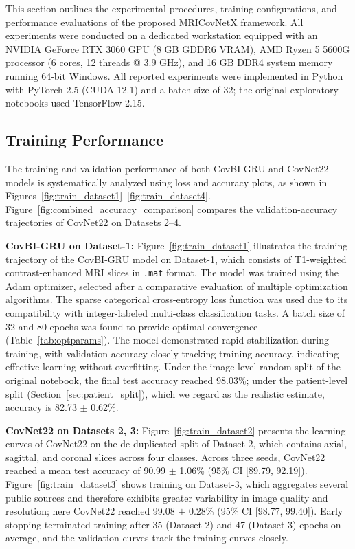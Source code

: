 \documentclass[a4paper,fleqn]{cas-sc}
\begin{document}
This section outlines the experimental procedures, training configurations, and performance evaluations of the proposed MRICovNetX framework. All experiments were conducted on a dedicated workstation equipped with an NVIDIA GeForce RTX 3060 GPU (8 GB GDDR6 VRAM), AMD Ryzen 5 5600G processor (6 cores, 12 threads @ 3.9 GHz), and 16 GB DDR4 system memory running 64-bit Windows. All reported experiments were implemented in Python with PyTorch 2.5 (CUDA 12.1) and a batch size of 32; the original exploratory notebooks used TensorFlow 2.15.

\subsection{Training Performance}

The training and validation performance of both CovBI-GRU and CovNet22 models is systematically analyzed using loss and accuracy plots, as shown in Figures~\ref{fig:train_dataset1}--\ref{fig:train_dataset4}. Figure~\ref{fig:combined_accuracy_comparison} compares the validation-accuracy trajectories of CovNet22 on Datasets 2--4.

\textbf{CovBI-GRU on Dataset-1:}  
Figure~\ref{fig:train_dataset1} illustrates the training trajectory of the CovBI-GRU model on Dataset-1, which consists of T1-weighted contrast-enhanced MRI slices in \texttt{.mat} format. The model was trained using the Adam optimizer, selected after a comparative evaluation of multiple optimization algorithms. The sparse categorical cross-entropy loss function was used due to its compatibility with integer-labeled multi-class classification tasks. A batch size of 32 and 80 epochs was found to provide optimal convergence (Table~\ref{tab:optparams}). The model demonstrated rapid stabilization during training, with validation accuracy closely tracking training accuracy, indicating effective learning without overfitting. Under the image-level random split of the original notebook, the final test accuracy reached 98.03\%; under the patient-level split (Section~\ref{sec:patient_split}), which we regard as the realistic estimate, accuracy is 82.73 $\pm$ 0.62\%.

\textbf{CovNet22 on Datasets 2, 3:}  
Figure~\ref{fig:train_dataset2} presents the learning curves of CovNet22 on the de-duplicated split of Dataset-2, which contains axial, sagittal, and coronal slices across four classes. Across three seeds, CovNet22 reached a mean test accuracy of 90.99 $\pm$ 1.06\% (95\% CI [89.79, 92.19]). Figure~\ref{fig:train_dataset3} shows training on Dataset-3, which aggregates several public sources and therefore exhibits greater variability in image quality and resolution; here CovNet22 reached 99.08 $\pm$ 0.28\% (95\% CI [98.77, 99.40]). Early stopping terminated training after 35 (Dataset-2) and 47 (Dataset-3) epochs on average, and the validation curves track the training curves closely.
\end{document}
